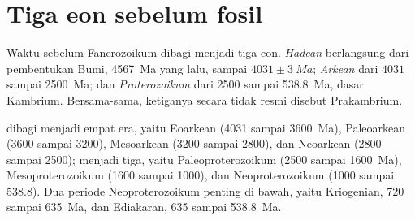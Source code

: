 \section{Tiga eon sebelum fosil}\label{sec:b2:precambrian-earth:eons}

\begin{definition}\label{def:b2:precambrian-earth:eons}
Waktu sebelum Fanerozoikum dibagi menjadi tiga eon. \emph{Hadean}
berlangsung dari pembentukan Bumi, \qty{4567}{Ma} yang lalu, sampai $4031 \pm \qty{3}{Ma}$;
\emph{Arkean} dari $4031$ sampai \qty{2500}{Ma}; dan
\emph{Proterozoikum} dari 2500 sampai \qty{538.8}{Ma}, dasar Kambrium.
Bersama-sama, ketiganya secara tidak resmi disebut Prakambrium.
\end{definition}

 dibagi menjadi empat era, yaitu Eoarkean (4031 sampai \qty{3600}{Ma}), Paleoarkean (3600
sampai 3200), Mesoarkean (3200 sampai 2800), dan Neoarkean (2800 sampai 2500);  menjadi tiga,
yaitu Paleoproterozoikum (2500 sampai \qty{1600}{Ma}), Mesoproterozoikum (1600 sampai 1000), dan
Neoproterozoikum (1000 sampai 538.8). Dua periode Neoproterozoikum penting di bawah, yaitu Kriogenian, 720 sampai
\qty{635}{Ma}, dan Ediakaran, 635 sampai \qty{538.8}{Ma}.

